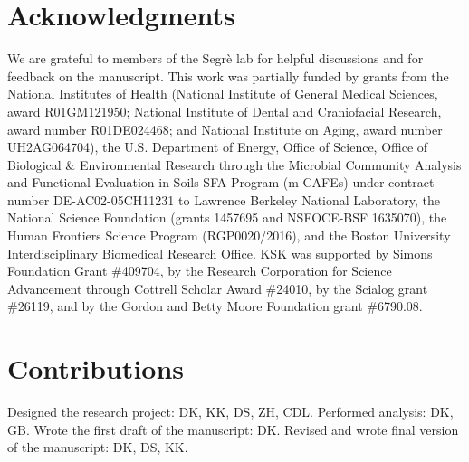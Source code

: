 \documentclass[letterpaper,12pt]{article}
\begin{document}

\section*{Acknowledgments}

We are grateful to members of the Segrè lab for helpful discussions and for feedback on the manuscript. This work was partially funded by grants from the National Institutes of Health (National Institute of General Medical Sciences, award R01GM121950; National Institute of Dental and Craniofacial Research, award number R01DE024468; and National Institute on Aging, award number UH2AG064704), the U.S. Department of Energy, Office of Science, Office of Biological \& Environmental Research through the Microbial Community Analysis and Functional Evaluation in Soils SFA Program (m-CAFEs) under contract number DE-AC02-05CH11231 to Lawrence Berkeley National Laboratory, the National Science Foundation (grants 1457695 and NSFOCE-BSF 1635070), the Human Frontiers Science Program (RGP0020/2016), and the Boston University Interdisciplinary Biomedical Research Office.
KSK was supported by Simons Foundation Grant \#409704, by the Research Corporation for Science Advancement through Cottrell Scholar Award \#24010, by the Scialog grant \#26119, and by the Gordon and Betty Moore Foundation grant \#6790.08.

\section*{Contributions}
Designed the research project: DK, KK, DS, ZH, CDL. Performed analysis: DK, GB. Wrote the first draft of the manuscript: DK. Revised and wrote final version of the manuscript: DK, DS, KK.


\newpage
\singlespacing
\printbibliography


\end{document}
